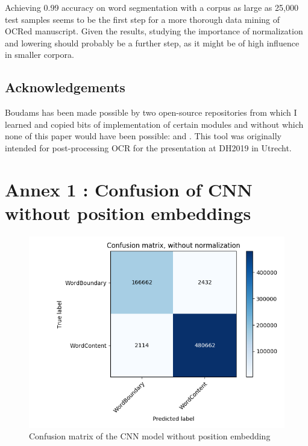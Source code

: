\documentclass{jdmdh}
\begin{document}
Achieving 0.99 accuracy on word segmentation with a corpus as large as 25,000 test samples seems to be the first step for a more thorough data mining of OCRed manuscript. Given the results, studying the importance of normalization and lowering should probably be a further step, as it might be of high influence in smaller corpora.

\subsection{Acknowledgements}

Boudams has been made possible by two open-source repositories from which I learned and copied bits of implementation of certain modules and without which none of this paper would have been possible: \citet{enrique_manjavacas_2019_2654987} and \citet{bentrevett}. This tool was originally intended for post-processing OCR for the presentation \citet{pinchecampsclerice} at DH2019 in Utrecht.






\appendix\footnotesize

\section{Annex 1 : Confusion of CNN without position embeddings}

\begin{figure}[H]
  \centering
  \includegraphics[width=\linewidth]{confusion.png}
  \caption{Confusion matrix of the CNN model without position embedding}
  \label{fig:confusion_matrix}
\end{figure}
\end{document}
